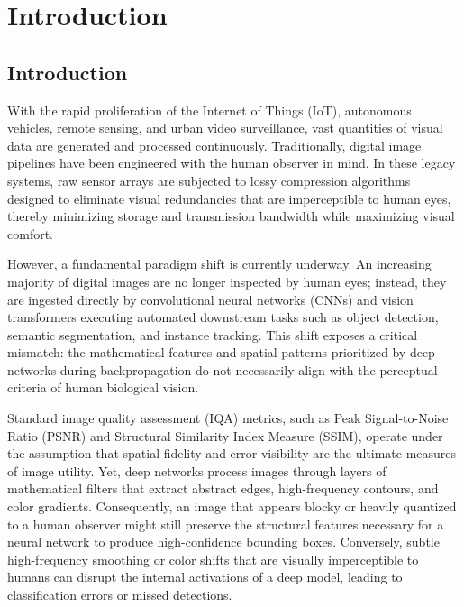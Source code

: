 \documentclass[12pt, a4paper]{article}
\begin{document}
\section{Introduction}

\subsection{Introduction}
With the rapid proliferation of the Internet of Things (IoT), autonomous vehicles, remote sensing, and urban video surveillance, vast quantities of visual data are generated and processed continuously. Traditionally, digital image pipelines have been engineered with the human observer in mind. In these legacy systems, raw sensor arrays are subjected to lossy compression algorithms designed to eliminate visual redundancies that are imperceptible to human eyes, thereby minimizing storage and transmission bandwidth while maximizing visual comfort. 

However, a fundamental paradigm shift is currently underway. An increasing majority of digital images are no longer inspected by human eyes; instead, they are ingested directly by convolutional neural networks (CNNs) and vision transformers executing automated downstream tasks such as object detection, semantic segmentation, and instance tracking. This shift exposes a critical mismatch: the mathematical features and spatial patterns prioritized by deep networks during backpropagation do not necessarily align with the perceptual criteria of human biological vision.

Standard image quality assessment (IQA) metrics, such as Peak Signal-to-Noise Ratio (PSNR) and Structural Similarity Index Measure (SSIM), operate under the assumption that spatial fidelity and error visibility are the ultimate measures of image utility. Yet, deep networks process images through layers of mathematical filters that extract abstract edges, high-frequency contours, and color gradients. Consequently, an image that appears blocky or heavily quantized to a human observer might still preserve the structural features necessary for a neural network to produce high-confidence bounding boxes. Conversely, subtle high-frequency smoothing or color shifts that are visually imperceptible to humans can disrupt the internal activations of a deep model, leading to classification errors or missed detections.
\end{document}
